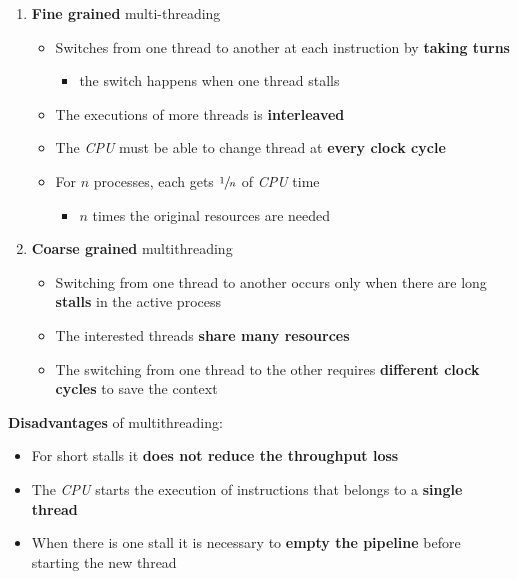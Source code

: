 \documentclass[english]{article}
\begin{document}
\begin{enumerate}
  \item \textbf{Fine grained} multi-threading
        \begin{itemize}
          \item Switches from one thread to another at each instruction by \textbf{taking turns}
                \begin{itemize}
                  \item the switch happens when one thread stalls
                \end{itemize}
          \item The executions of more threads is \textbf{interleaved}
          \item The \textit{CPU} must be able to change thread at \textbf{every clock cycle}
          \item For \(n\) processes, each gets \(\sfrac{1}{n}\) of \textit{CPU} time
                \begin{itemize}
                  \item \(n\) times the original resources are needed
                \end{itemize}
        \end{itemize}
  \item \textbf{Coarse grained} multithreading
        \begin{itemize}
          \item Switching from one thread to another occurs only when there are long \textbf{stalls} in the active process
          \item The interested threads \textbf{share many resources}
          \item The switching from one thread to the other requires \textbf{different clock cycles} to save the context
        \end{itemize}
\end{enumerate}

\bigskip

\textbf{Disadvantages} of multithreading:
\begin{itemize}[label=\xmarkthin]
  \item For short stalls it \textbf{does not reduce the throughput loss}
  \item The \textit{CPU} starts the execution of instructions that belongs to a \textbf{single thread}
  \item When there is one stall it is necessary to \textbf{empty the pipeline} before starting the new thread
\end{itemize}
\end{document}
